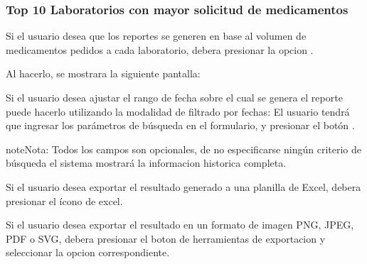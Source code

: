 \documentclass[a4paper,10pt,spanish]{sphinxmanual}
\begin{document}
\subsubsection{Top 10 Laboratorios con mayor solicitud de medicamentos}
\label{pedidosalab:top-10-laboratorios-con-mayor-solicitud-de-medicamentos}\label{pedidosalab:top10-meds-pl}
Si el usuario desea que los reportes se generen en base al volumen de medicamentos pedidos a cada laboratorio, debera presionar la opcion .


Al hacerlo, se mostrara la siguiente pantalla:


Si el usuario desea ajustar el rango de fecha sobre el cual se genera el reporte puede hacerlo utilizando la modalidad de filtrado por fechas:
El usuario tendrá que ingresar los parámetros de búsqueda en el formulario, y presionar el botón .

\begin{notice}{note}{Nota:}
Todos los campos son opcionales, de no especificarse ningún criterio de búsqueda el sistema mostrará la informacion historica completa.
\end{notice}


Si el usuario desea exportar el resultado generado a una planilla de Excel, debera presionar el ícono de excel.


Si el usuario desea exportar el resultado en un formato de imagen PNG, JPEG, PDF o SVG, debera presionar el boton de herramientas de exportacion y seleccionar la opcion correspondiente.

\end{document}
